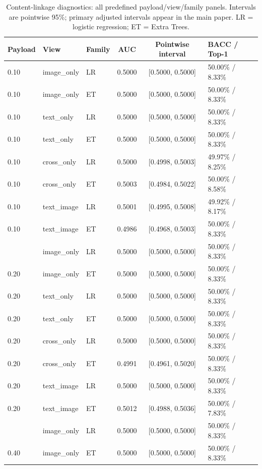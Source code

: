 \documentclass[journal]{IEEEtran}
\renewcommand{\arraystretch}{1.2}
\renewcommand{\arraystretch}{1.0}
\theoremstyle{definition}
\theoremstyle{game}
\renewcommand{\arraystretch}{1.5}
\begin{document}
\begin{table}[p]
\centering\footnotesize
\caption{Content-linkage diagnostics: all predefined payload/view/family panels. Intervals are pointwise 95\%; primary adjusted intervals appear in the main paper. LR = logistic regression; ET = Extra Trees.}
\label{tab:content-all-panels}
\setlength{\tabcolsep}{5pt}\renewcommand{\arraystretch}{1.04}
\begin{tabular}{@{}lllccl@{}}
\toprule
Payload & View & Family & AUC & Pointwise interval & BACC / Top-1\\
\midrule
0.10 & image\_only & LR & 0.5000 & [0.5000, 0.5000] & 50.00\% / 8.33\%\\
0.10 & image\_only & ET & 0.5000 & [0.5000, 0.5000] & 50.00\% / 8.33\%\\
0.10 & text\_only & LR & 0.5000 & [0.5000, 0.5000] & 50.00\% / 8.33\%\\
0.10 & text\_only & ET & 0.5000 & [0.5000, 0.5000] & 50.00\% / 8.33\%\\
0.10 & cross\_only & LR & 0.5000 & [0.4998, 0.5003] & 49.97\% / 8.25\%\\
0.10 & cross\_only & ET & 0.5003 & [0.4984, 0.5022] & 50.00\% / 8.58\%\\
0.10 & text\_image & LR & 0.5001 & [0.4995, 0.5008] & 49.92\% / 8.17\%\\
0.10 & text\_image & ET & 0.4986 & [0.4968, 0.5003] & 50.00\% / 8.33\%\\
\addlinespace[4pt]
0.20 & image\_only & LR & 0.5000 & [0.5000, 0.5000] & 50.00\% / 8.33\%\\
0.20 & image\_only & ET & 0.5000 & [0.5000, 0.5000] & 50.00\% / 8.33\%\\
0.20 & text\_only & LR & 0.5000 & [0.5000, 0.5000] & 50.00\% / 8.33\%\\
0.20 & text\_only & ET & 0.5000 & [0.5000, 0.5000] & 50.00\% / 8.33\%\\
0.20 & cross\_only & LR & 0.5000 & [0.5000, 0.5000] & 50.00\% / 8.33\%\\
0.20 & cross\_only & ET & 0.4991 & [0.4961, 0.5020] & 50.00\% / 8.33\%\\
0.20 & text\_image & LR & 0.5000 & [0.5000, 0.5000] & 50.00\% / 8.33\%\\
0.20 & text\_image & ET & 0.5012 & [0.4988, 0.5036] & 50.00\% / 7.83\%\\
\addlinespace[4pt]
0.40 & image\_only & LR & 0.5000 & [0.5000, 0.5000] & 50.00\% / 8.33\%\\
0.40 & image\_only & ET & 0.5000 & [0.5000, 0.5000] & 50.00\% / 8.33\%\\

\end{tabular}
\end{table}
\end{document}
